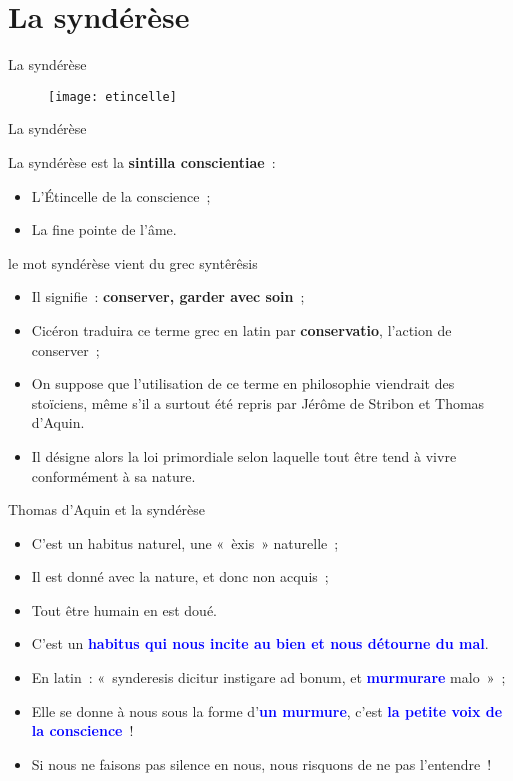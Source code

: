 \documentclass[11pt,xcolor=dvipsname,ignorenonframetext,handout]{beamer}
\begin{document}
\section{La syndérèse}
\begin{frame}{La syndérèse}
    {
        \begin{figure}
          \centering
          \texttt{[image: etincelle]}
        \end{figure}
          }    
\end{frame}
\begin{frame}{La syndérèse}
    \begin{block}{La syndérèse est la \textbf{sintilla conscientiae}~:}
        \begin{itemize}
            \rightskip=0pt\leftskip=0pt 
            \item L'Étincelle de la conscience~;
            \item La fine pointe de l'âme.
        \end{itemize}       
    \end{block}
    \begin{exampleblock}{le mot syndérèse vient du grec syntêrêsis}
        \begin{itemize}
            \rightskip=0pt\leftskip=0pt
            \item Il signifie~: \textbf{conserver, garder avec soin}~;
            \item Cicéron traduira ce terme grec en latin par \textbf{conservatio}, l'action de conserver~;
            \item On suppose que l'utilisation de ce terme en philosophie viendrait des stoïciens, même s'il a surtout été repris par Jérôme de Stribon et Thomas d'Aquin.
            \item Il désigne alors la loi primordiale selon laquelle tout être tend à vivre conformément à sa nature.
        \end{itemize}
    \end{exampleblock}
\end{frame}
\begin{frame}{Thomas d'Aquin et la syndérèse}
   \begin{itemize}
        \rightskip=0pt\leftskip=0pt
        \item C'est un habitus naturel, une «~èxis~» naturelle~;
        \item Il est donné avec la nature, et donc non acquis~;
        \item Tout être humain en est doué.
        \item C'est un \textcolor{blue}{\textbf{habitus qui nous incite au bien et nous détourne du mal}}.
        \item En latin~: «~synderesis dicitur instigare ad bonum, et \textcolor{blue}{\textbf{murmurare}} malo~»~;
        \item Elle se donne à nous sous la forme d'\textcolor{blue}{\textbf{un murmure}}, c'est \textcolor{blue}{\textbf{la petite voix de la conscience}}~!
        \item Si nous ne faisons pas silence en nous, nous risquons de ne pas l'entendre~!
    \end{itemize}
\end{frame}
\end{document}
